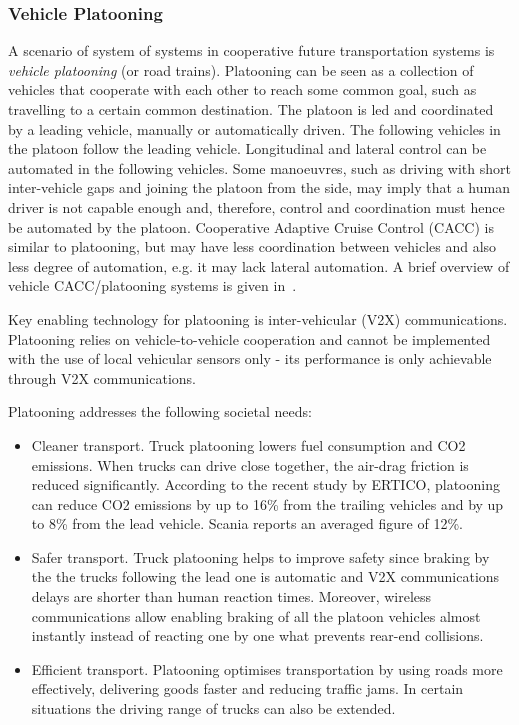 \subsubsection{Vehicle Platooning}
\label{sub:platooning}
A scenario of system of systems in cooperative future transportation systems is \emph{vehicle platooning} (or road trains). Platooning can be seen as a collection of vehicles that cooperate with each other to reach some common goal, such as travelling to a certain common destination. The platoon is led and coordinated by a leading vehicle, manually or automatically driven. The following vehicles in the platoon follow the leading vehicle. Longitudinal and lateral control can be automated in the following vehicles. Some manoeuvres, such as driving with short inter-vehicle gaps and joining the platoon from the side, may imply that a human driver is not capable enough and, therefore, control and coordination must hence be automated by the platoon. Cooperative Adaptive Cruise Control (CACC) is similar to platooning, but may have less coordination between vehicles and also less degree of automation, e.g. it may lack lateral automation. A brief overview of vehicle CACC/platooning systems is given in~\cite{bergenhem2012,platooning2015}.

Key enabling technology for platooning is inter-vehicular (V2X) communications. Platooning relies on vehicle-to-vehicle cooperation and cannot be implemented with the use of local vehicular sensors only - its performance is only achievable through V2X communications.

Platooning addresses the following societal needs:
\begin{itemize}

\item Cleaner transport. Truck platooning lowers fuel consumption and CO2 emissions. When trucks can drive close together, the air-drag friction is reduced significantly. According to the recent study by ERTICO, platooning can reduce CO2 emissions by up to 16\% from the trailing vehicles and by up to 8\% from the lead vehicle. Scania reports an averaged figure of 12\%.
\item Safer transport. Truck platooning helps to improve safety since braking by the the trucks following the lead one is automatic and V2X communications delays are shorter than human reaction times. Moreover, wireless communications allow enabling braking of all the platoon vehicles almost instantly instead of reacting one by one what prevents rear-end collisions. 
\item Efficient transport. Platooning optimises transportation by using roads more effectively, delivering goods faster and reducing traffic jams. In certain situations the driving range of trucks can also be extended. 
\end{itemize}

